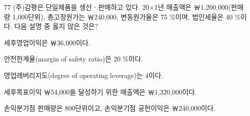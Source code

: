 \begin{question}{77}
(주)감평은 단일제품을 생산ㆍ판매하고 있다. 20×1년 매출액은 ￦1,200,000(판매량 1,000단위), 총고정원가는 ￦240,000, 변동원가율은 75 \%이며, 법인세율은 40 \%이다. 다음 설명 중 옳지 않은 것은?
\begin{choices}
  \item 세후영업이익은 ￦36,000이다.
  \item 안전한계율(margin of safety ratio)은 20 \%이다.
  \item 영업레버리지도(degree of operating leverage)는 4이다.
  \item 세후목표이익 ￦54,000을 달성하기 위한 매출액은 ￦1,320,000이다.
  \item 손익분기점 판매량은 800단위이고, 손익분기점 공헌이익은 ￦240,000이다.
\end{choices}
\end{question}
